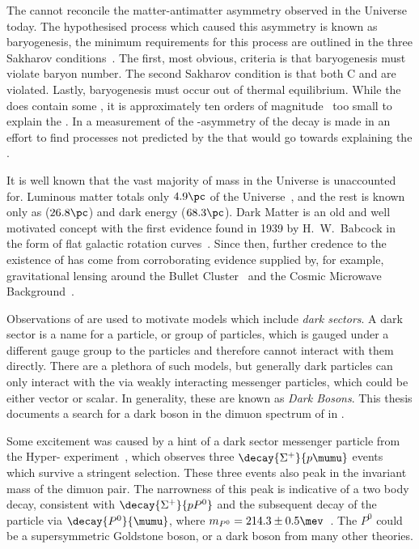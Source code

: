 The \sm cannot reconcile the matter-antimatter asymmetry observed in the
Universe today.
The hypothesised process which caused this asymmetry is known as baryogenesis, the minimum
requirements for this process are outlined in the
three Sakharov
conditions~\cite{1991SvPhU..34..392S}.
The first, most obvious, criteria is that baryogenesis must violate baryon number.
The second Sakharov condition is that both \gls{C} and \CP are violated.
Lastly, baryogenesis must occur out of thermal equilibrium.
While the \sm does contain  some \CPV, it is approximately ten orders of
magnitude~\cite{Cline:2006ts,Huet:1994jb} too small to explain the \BAU.
In  a measurement of the \CP-asymmetry of the decay \btodsphi is made in an effort
to find \CPV processes not predicted by the \sm that would go towards explaining the \BAU.


It is well known that the vast majority of mass in the Universe is unaccounted for.
Luminous matter totals only \approx$4.9\pc$ of the Universe~\cite{Adam:2015rua,PDG2014}, and the rest
is known only as \dm (\approx$26.8\pc$) and dark energy (\approx$68.3\pc$).
Dark Matter is an old and well motivated concept with the first evidence found in 1939 by H.~W.~Babcock
in the form of flat galactic rotation curves~\cite{1970ApJ...159..379R,1980ApJ...238..471R}.
Since then, further credence to the existence of \dm has come from corroborating evidence supplied
by, for example, gravitational lensing around the Bullet
Cluster~\cite{Markevitch:2003at} and the Cosmic Microwave Background~\cite{1990ApJ...349L...1T}.


Observations of \dm are used to motivate \np models which include \emph{dark sectors}.
A dark sector is a name for a particle, or group of particles, which is gauged under a
different gauge group to the \sm particles and therefore cannot interact with them directly.
There are a plethora of such models, but generally dark particles can only interact with the \sm
via weakly interacting messenger particles, which could be either vector or scalar.
In generality, these are known as \emph{Dark Bosons}.
This thesis documents a search for a dark boson in the dimuon spectrum of \btokstrmumu in
.

Some excitement was caused by a hint of a dark sector messenger particle from the Hyper-\CP
experiment~\cite{Burnstein:2004uk}, which observes three $\decay{\Sigma^+}{p\mumu}$ events which
survive a stringent selection.
These three events also peak in the invariant mass of the dimuon pair.
The narrowness of this peak is indicative of a two body decay, consistent with
$\decay{\Sigma^+}{pP^0}$ and the subsequent decay of the \np particle via $\decay{P^0}{\mumu}$,
where $m_{P^0}=214.3\pm0.5\mev$~\cite{Park:2005eka}.
The $P^0$ could be a supersymmetric Goldstone boson, or a dark boson from many other theories.



